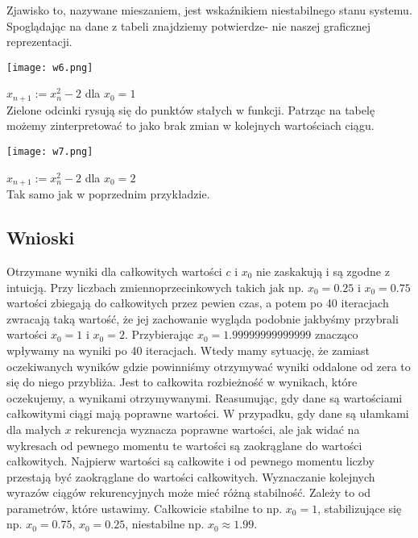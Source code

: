 \documentclass{article}
\begin{document}
\begin{center}
\begin{center}
        Zjawisko to, nazywane mieszaniem, jest wskaźnikiem niestabilnego stanu systemu.
        Spoglądając na dane z tabeli znajdziemy potwierdze- nie naszej graficznej reprezentacji.
    \end{center}
    \newpage
    \texttt{[image: w6.png]}
    \begin{center}
        \(x_{n+1}:=x_{n}^2-2\) dla \(x_{0}=1\) \\
        Zielone odcinki rysują się do punktów stałych w funkcji.
         Patrząc na tabelę możemy zinterpretować to jako brak zmian w kolejnych wartościach ciągu.
    \end{center}
    \newpage
    \texttt{[image: w7.png]}
    \begin{center}
        \(x_{n+1}:=x_{n}^2-2\) dla \(x_{0}=2\) \\ 
        Tak samo jak w poprzednim przykładzie.
    \end{center}

    \subsection{Wnioski}

    Otrzymane wyniki dla całkowitych wartości \(c\) i \(x_{0}\) nie zaskakują i są zgodne z intuicją.
    Przy liczbach zmiennoprzecinkowych takich jak np. \(x_{0} = 0.25\) i \(x_{0} = 0.75\) wartości zbiegają do całkowitych przez pewien czas,
    a potem po 40 iteracjach zwracają taką wartość, że jej zachowanie wygląda podobnie jakbyśmy przybrali wartości \(x_{0} = 1\) i \(x_{0} = 2\).
    Przybierając \(x_{0} = 1.99999999999999\) znacząco wpływamy na wyniki po 40 iteracjach.
    Wtedy mamy sytuację, że zamiast oczekiwanych wyników gdzie powinniśmy otrzymywać wyniki oddalone od zera to się do niego przybliża.
    Jest to całkowita rozbieżność w wynikach, które oczekujemy, a wynikami otrzymywanymi.
    Reasumując, gdy dane są wartościami całkowitymi ciągi mają poprawne wartości. 
    W przypadku, gdy dane są ułamkami dla małych \(x\) rekurencja wyznacza poprawne wartości, ale jak widać na wykresach od pewnego momentu te wartości są zaokrąglane do wartości całkowitych.
    Najpierw wartości są całkowite i od pewnego momentu liczby przestają być zaokrąglane do wartości całkowitych. Wyznaczanie kolejnych wyrazów ciągów rekurencyjnych może mieć różną stabilność.
    Zależy to od parametrów, które ustawimy. Całkowicie stabilne to np. \(x_{0} = 1\), stabilizujące się np. \(x_{0} = 0.75\), \(x_{0} = 0.25\), niestabilne np. \(x_{0} \approx 1.99\).
    
    \end{center}
\end{document}
